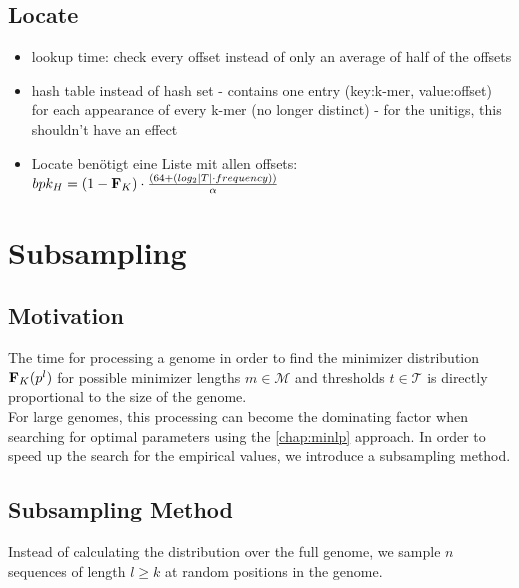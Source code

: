 \documentclass[a4paper,titlepage,onecolumn,oneside,12pt,nenglish,titlepage=firstiscover]{scrbook}
\theoremstyle{plain} %
\theoremstyle{definition} %
\theoremstyle{remark} %
\theoremstyle{plain}
\newcommand{\level}{l}
\newcommand{\possibleMinimizerLengths}{\mathcal{M}}
\newcommand{\possibleThresholds}{\mathcal{T}}
\newcommand{\numberOfSamples}{n}
\newcommand{\lengthOfSamples}{l}
\begin{document}
\section{Locate}
\begin{itemize}
	\item lookup time: check every offset instead of only an average of half of the offsets
	\item hash table instead of hash set - contains one entry (key:k-mer, value:offset) for each appearance of every k-mer (no longer distinct) - for the unitigs, this shouldn't have an effect
	\item Locate benötigt eine Liste mit allen offsets: $bpk_H = (1-\textbf{F}_{K}) \cdot \frac{(64 + (log_2|T|\cdot frequency))}{\alpha}$
\end{itemize}


\chapter{Subsampling}\label{chap:subsampling}
\section{Motivation}
The time for processing a genome in order to find the minimizer distribution $\varCDF{K}(\levelParameters{\level})$ for possible minimizer lengths $m \in \possibleMinimizerLengths$ and thresholds $t \in \possibleThresholds$ is directly proportional to the size of the genome.\\
For large genomes, this processing can become the dominating factor when searching for optimal parameters using the \cref{chap:minlp} approach. In order to speed up the search for the empirical values, we introduce a subsampling method.

\section{Subsampling Method}
Instead of calculating the distribution over the full genome, we sample $\numberOfSamples$ sequences of length $\lengthOfSamples \geq k$ at random positions in the genome.\\
\end{document}
